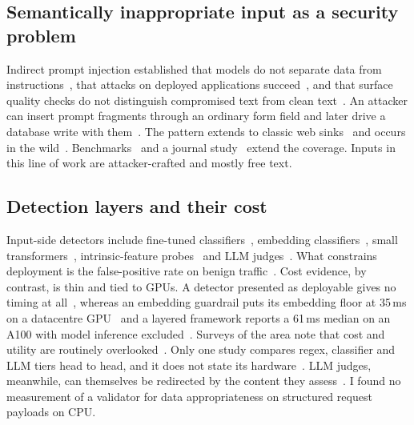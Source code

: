 \documentclass[conference]{IEEEtran}
\begin{document}
\subsection{Semantically inappropriate input as a security problem}
Indirect prompt injection established that models do not separate data from
instructions~\cite{greshake2023indirect}, that attacks on deployed applications
succeed~\cite{liu2023houyi,kaya2026chatbotplugins}, and that surface quality checks do not distinguish
compromised text from clean text~\cite{liu2024formalizing}. An attacker can insert prompt fragments
through an ordinary form field and later drive a database write with them~\cite{pedro2025p2sql}. The
pattern extends to classic web sinks~\cite{tsigkopoulos2026webexploitation} and occurs in the
wild~\cite{khodayari2026ipiwild}. Benchmarks~\cite{yi2025bipia,evtimov2025wasp,liu2025wainjectbench}
and a journal study~\cite{milani2026ipi} extend the coverage. Inputs in this line of work are
attacker-crafted and mostly free text.

\subsection{Detection layers and their cost}
Input-side detectors include fine-tuned classifiers~\cite{jacob2025promptshield,liu2025datasentinel},
embedding classifiers~\cite{ayub2024embedding,ahmed2026reflexguard}, small
transformers~\cite{datta2025javelinguard,lakara2026fence}, intrinsic-feature
probes~\cite{shi2025promptarmor,akinrele2026regime} and LLM
judges~\cite{le2026llmjudge,rebedea2023nemo}. What constrains deployment is the false-positive rate on benign
traffic~\cite{li2024injecguard}. Cost evidence, by contrast, is thin and tied to GPUs. A detector
presented as deployable gives no timing at all~\cite{jacob2025promptshield}, whereas an embedding
guardrail puts its embedding floor at 35\,ms on a datacentre GPU~\cite{ahmed2026reflexguard} and a
layered framework reports a 61\,ms median on an A100 with model inference
excluded~\cite{saleem2026layered}. Surveys of the area note that cost and utility are routinely
overlooked~\cite{wang2026sokguardrails,zizzo2025guardrails,kumar2025nofreelunch}. Only one study
compares regex, classifier and LLM tiers head to head, and it does not state its
hardware~\cite{maiorano2026tradeoffs}. LLM judges, meanwhile, can themselves be
redirected by the content they assess~\cite{shi2024judgeattack}. I found no measurement of a validator for data appropriateness
on structured request payloads on CPU.
\end{document}
